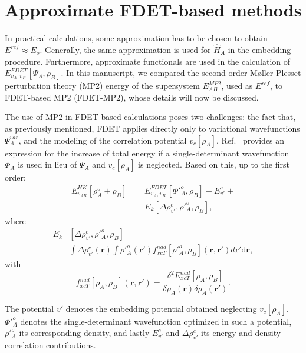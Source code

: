 \documentclass[journal=jctcce,manuscript=article, layout=twocolumn]{achemso}
\begin{document}
\section{Approximate FDET-based methods}\label{sect:FDET_approx}
In practical calculations, some approximation has to be chosen to obtain $E^{ref} \approx E_o$. Generally, the same approximation is used for $\hat{H}_A$ in the embedding procedure.
Furthermore, approximate functionals are used in the calculation of $E_{v_A,v_B}^{FDET}[\Psi_{A},\rho_B]$.
In this manuscript, we compared the second order M{\o}ller-Plesset perturbation theory (MP2) energy of the supersystem $E^{MP2}_{AB}$, used as $E^{ref}$, to FDET-based MP2 (FDET-MP2), whose details will now be discussed.

The use of MP2 in FDET-based calculations poses two challenges: the fact that, as previously mentioned, FDET applies directly only to variational wavefunctions $\Psi_A^{var}$, and the modeling of the correlation potential $v_c[\rho_A]$. Ref.~ provides an expression for the increase of total energy if a single-determinant wavefunction $\Phi_A$ is used in lieu of $\Psi_A$ and $v_c[\rho_A]$ is neglected. Based on this, up to the first order:
\begin{align} \label{eq:E_FDET_novc}
 E_{v_{AB}}^{HK}[\rho_A^{o}+\rho_B] =  & E_{v_A,v_B}^{FDET}[\Phi'^{o}_{A},\rho_B] + E^c_{v'} + \\ \nonumber
 & E_k[\Delta \rho^c_{v'}, \rho'^{o}_A, \rho_B],
\end{align}
where
\begin{align} \label{eq:kernel}
 E_k & [\Delta \rho^c_{v'}, \rho'^{o}_A, \rho_B] = \\ \nonumber
 & \int \Delta \rho^c_{v'}(\mathbf{r}) \int \rho'^{o}_A(\mathbf{r'})f^{nad}_{xcT}[\rho'^{o}_A, \rho_B](\mathbf{r},\mathbf{r'})d\mathbf{r'}\mathrm{d}\mathbf{r},
\end{align}
with
\begin{equation} \label{eq:f_nad}
 f^{nad}_{xcT}[\rho_A, \rho_B](\mathbf{r},\mathbf{r'}) = \frac{\delta^2 E^{nad}_{xcT}[\rho_A, \rho_B]}{\delta \rho_A(\mathbf{r}) \delta \rho_A(\mathbf{r'})}.
\end{equation}

The potential $v'$ denotes the embedding potential obtained neglecting $v_c[\rho_A]$. $\Phi'^{o}_A$ denotes the single-determinant wavefunction optimized in such a potential, $\rho'^{o}_A$ its corresponding density, and lastly $E^c_{v'}$ and $\Delta \rho^c_{v'}$ its energy and density correlation contributions.
\end{document}
